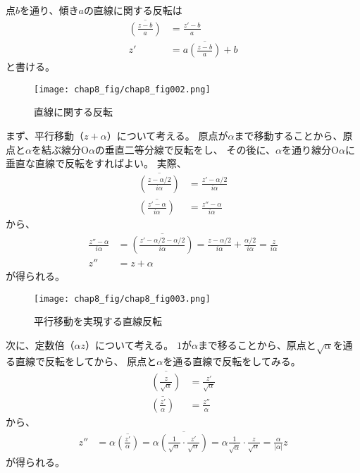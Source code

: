点$b$を通り、傾き$a$の直線に関する反転は
\begin{align*}
    \overline{\left(\frac{z-b}{a}\right)}
    &=\frac{z'-b}{a}\\
    z'&=a\overline{\left(\frac{z-b}{a}\right)}+b
\end{align*}
と書ける。
\begin{figure}[h]
    \centering
    \texttt{[image: chap8\_fig/chap8\_fig002.png]}
    \caption{直線に関する反転}
    \label{fig:chap8_line}
\end{figure}

\newpage
まず、平行移動（$z+\alpha$）について考える。
原点が$\alpha$まで移動することから、原点と$\alpha$を結ぶ線分$\mathrm{O}\alpha$の垂直二等分線で反転をし、
その後に、$\alpha$を通り線分$\mathrm{O}\alpha$に垂直な直線で反転をすればよい。
実際、
\begin{align*}
    \overline{\left(\frac{z-\alpha/2}{i\alpha}\right)}
    &=\frac{z'-\alpha/2}{i\alpha}\\
    \overline{\left(\frac{z'-\alpha}{i\alpha}\right)}
    &=\frac{z''-\alpha}{i\alpha}
\end{align*}
から、
\begin{align*}
    \frac{z''-\alpha}{i\alpha}
    &=\overline{\left(\frac{z'-\alpha/2-\alpha/2}{i\alpha}\right)}
    =\frac{z-\alpha/2}{i\alpha}+\frac{\alpha/2}{i\alpha}
    =\frac{z}{i\alpha}\\
    z''&=z+\alpha
\end{align*}
が得られる。
\begin{figure}[h]
    \centering
    \texttt{[image: chap8\_fig/chap8\_fig003.png]}
    \caption{平行移動を実現する直線反転}
    \label{fig:chap8_parallel}
\end{figure}

\newpage
次に、定数倍（$\alpha z$）について考える。
$1$が$\alpha$まで移ることから、原点と$\sqrt{\alpha}$を通る直線で反転をしてから、
原点と$\alpha$を通る直線で反転をしてみる。
\begin{align*}
    \overline{\left(\frac{z}{\sqrt{\alpha}}\right)}
    &=\frac{z'}{\sqrt{\alpha}}\\
    \overline{\left(\frac{z'}{\alpha}\right)}
    &=\frac{z''}{\alpha}
\end{align*}
から、
\begin{align*}
    z''&=\alpha\overline{\left(\frac{z'}{\alpha}\right)}
    =\alpha\overline{\left(\frac{1}{\sqrt{\alpha}}\cdot\frac{z'}{\sqrt{\alpha}}\right)}
    =\alpha\frac{1}{\overline{\sqrt{\alpha}}}\cdot\frac{z}{\sqrt{\alpha}}
    =\frac{\alpha}{|\alpha|}z
\end{align*}
が得られる。

